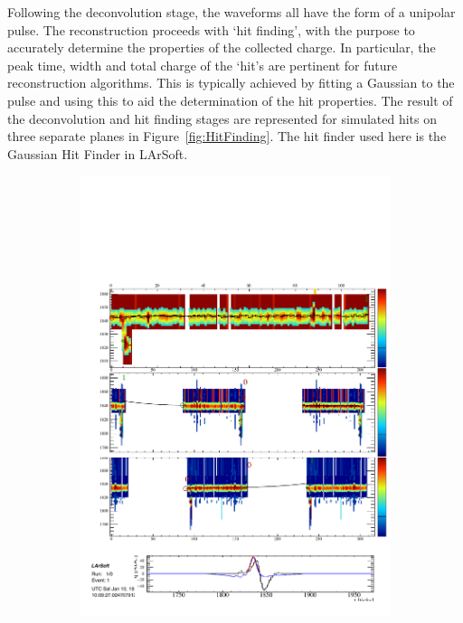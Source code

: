 Following the deconvolution stage, the waveforms all have the form of a unipolar pulse.  The reconstruction proceeds with `hit finding', with the purpose to accurately determine the properties of the collected charge.  In particular, the peak time, width and total charge of the `hit's are pertinent for future reconstruction algorithms.  This is typically achieved by fitting a Gaussian to the pulse and using this to aid the determination of the hit properties.  The result of the deconvolution and hit finding stages are represented for simulated hits on three separate planes in Figure~\ref{fig:HitFinding}.  The hit finder used here is the Gaussian Hit Finder in LArSoft.

\begin{figure}
  \centering
  \begin{subfigure}[t]{0.3\linewidth}
    \centering
    \includegraphics[width=\textwidth]{HitFindingU.pdf}

\end{subfigure}
\end{figure}

